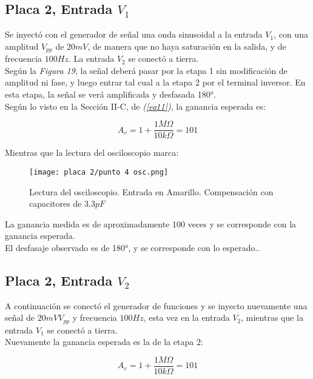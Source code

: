 \documentclass[letterpaper, 10 pt, conference]{ieeeconf}  %
\begin{document}
\subsection{Placa 2, Entrada $V_1$} %
Se inyectó con el generador de señal una onda sinusoidal a la entrada $V_1$, con una amplitud $V_{pp}$ de $20mV$, de manera que no haya saturación en la salida, y de frecuencia $100Hz$. La entrada $V_2$ se conectó a tierra.\\

Según la \textit{Figura 19}, la señal deberá pasar por la etapa 1 sin modificación de amplitud ni fase, y luego entrar tal cual a la etapa 2 por el terminal inversor.
En esta etapa, la señal se verá amplificada y desfasada 180°.\\
Según lo visto en la Sección II-C, de \textit{(\ref{eq11})}, la ganancia esperada es:


            \begin{equation}
            A_v =1 + \frac{1M\Omega}{10k\Omega} =  101
            \end{equation}
            
Mientras que la lectura del osciloscopio marca:

\begin{figure}[H]
  \centering
  \texttt{[image: placa 2/punto 4 osc.png]}
  \caption{Lectura del osciloscopio. Entrada en Amarillo. Compensación con capacitores de $3.3pF$ }
  \label{fig:fotoplaca2}
\end{figure}

La ganancia medida es de aproximadamente 100 veces y se corresponde con la ganancia esperada.\\
El desfasaje observado es de 180°, y se corresponde con lo esperado..\\

\subsection{Placa 2, Entrada $V_2$} %

A continuación se conectó el generador de funciones y se inyecto nuevamente una señal de $20mV V_{pp}$ y frecuencia $100Hz$, esta vez en la entrada $V_2$, mientras que la entrada $V_1$ se conectó a tierra.\\

Nuevamente la ganancia esperada es la de la etapa 2:

\begin{equation}
            A_v =1 + \frac{1M\Omega}{10k\Omega} =  101
            \end{equation}
\end{document}
